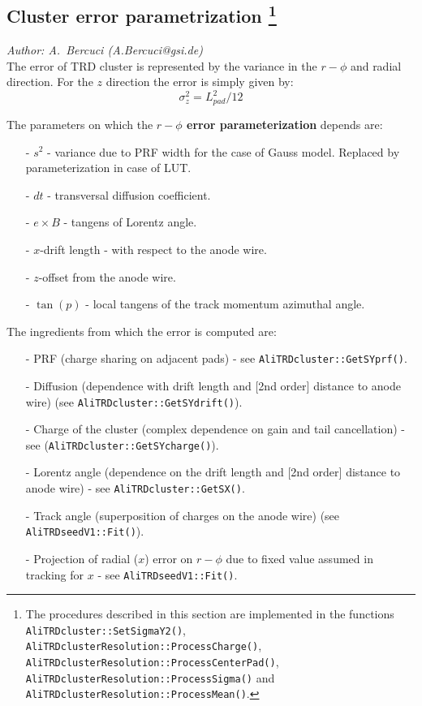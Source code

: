 \documentclass{alicetdr}
\begin{document}
\subsection[Cluster error parameterization]{Cluster error parametrization
\footnote{The procedures described in this section are implemented in the functions
{\tt AliTRDcluster::SetSigmaY2()}, {\tt AliTRDclusterResolution::ProcessCharge()},
{\tt AliTRDclusterResolution::ProcessCenterPad()},
{\tt AliTRDclusterResolution::ProcessSigma()} and
{\tt AliTRDclusterResolution::ProcessMean()}.}}\label{REC:CL:error}
{\it Author: A.~Bercuci (A.Bercuci@gsi.de)}
\\

The error of TRD cluster is represented by the variance in the $r-\phi$ and radial
direction. For the $z$ direction the error is simply given by:
\begin{equation}
\sigma^2_z=L^2_{pad}/12
\end{equation}

The parameters on which the {\bf $r-\phi$ error parameterization} depends are:
\begin{itemize}
  \item[-] $s^2$  - variance due to PRF width for the case of Gauss model. Replaced
           by parameterization in case of LUT.
  \item[-] $dt$  - transversal diffusion coefficient.
  \item[-] $e \times B$ - tangens of Lorentz angle.
  \item[-] $x$-drift length - with respect to the anode wire.
  \item[-] $z$-offset from the anode wire.
  \item[-] $\tan(p)$ - local tangens of the track momentum azimuthal angle.
\end{itemize}

The ingredients from which the error is computed are:
\begin{itemize}
  \item[-] PRF (charge sharing on adjacent pads)  - see {\tt AliTRDcluster::GetSYprf()}.
  \item[-] Diffusion (dependence with drift length and [2nd order] distance to anode wire)
           (see {\tt AliTRDcluster::GetSYdrift()}).
  \item[-] Charge of the cluster (complex dependence on gain and tail cancellation) - see
           ({\tt AliTRD\-cluster::GetSYcharge()}).
  \item[-] Lorentz angle (dependence on the drift length and [2nd order] distance to anode
           wire) - see {\tt AliTRDcluster::GetSX()}.
  \item[-] Track angle (superposition of charges on the anode wire)
           (see {\tt AliTRDseedV1::Fit()}).
  \item[-] Projection of radial ($x$) error on $r-\phi$ due to fixed value assumed in
           tracking for $x$ - see {\tt AliTRDseedV1::Fit()}.
\end{itemize}
\end{document}
